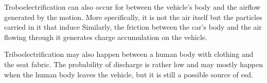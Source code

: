 Troboelectrification can also occur for between the vehicle's body and the airflow generated by the motion.
More specifically, it is not the air itself but the particles carried in it that induce
Similarly, the friction between the car's body and the air flowing through it generates charge accumulation on the vehicle.

Triboelectrification may also happen between a human body with clothing and the seat fabric.
The probability of discharge is rather low \cite{generationESDautomotive} and may mostly happen when the human body leaves the vehicle, but it is still a possible source of \gls{esd}.
